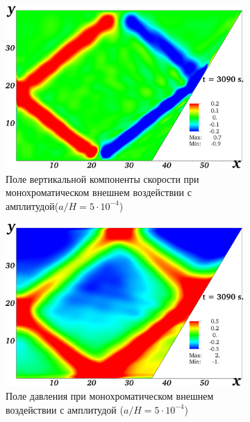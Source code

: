 \begin{figure}
	\centering
	\begin{subfigure}[с]{0.45\textwidth}
	    \includegraphics[width=1\textwidth]{pics/H40L60N1ap05dp20w0p63/2D36x36DiagramH40L60N1ap05dp20w0p63Vyn00308.png}
	    \caption{Поле вертикальной компоненты скорости при монохроматическом внешнем воздействии с амплитудой($a/H=5\cdot 10^{-4}$)}
	\end{subfigure}
	\begin{subfigure}[с]{0.45\textwidth}
	    \includegraphics[width=1\textwidth]{pics/H40L60N1ap05dp20w0p63/2D36x36DiagramH40L60N1ap05dp20w0p63Pn00308.png}
	    \caption{Поле давления при монохроматическом внешнем воздействии с амплитудой ($a/H=5\cdot 10^{-4}$)}
	\end{subfigure}
	\par
	\begin{subfigure}[с]{0.45\textwidth}

\end{subfigure}
\end{figure}
